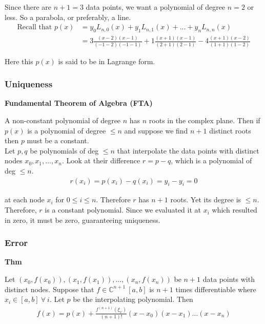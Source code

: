 \documentclass[12pt, letterpaper]{article}
\begin{document}
    Since there are $n+1=3$ data points, we want a polynomial of degree $n=2$ or less. 
    So a parabola, or preferably, a line.
    \begin{align*}
        \text{Recall that } p(x) &= y_0 L_{n,0}(x) + y_1 L_{n,1}(x) + ... + y_n L_{n,n}(x) \\
        &= 3 \frac{(x-2)(x-1)}{(-1-2)(-1-1)} + 1 \frac{(x+1)(x-1)}{(2+1)(2-1)} - 4 \frac{(x+1)(x-2)}{(1+1)(1-2)}
    \end{align*}

    \noindent Here this $p(x)$ is said to be in Lagrange form.

\subsubsection{Uniqueness}
\textbf{Fundamental Theorem of Algebra (FTA)}

A non-constant polynomial of degree $n$ has $n$ roots in the complex plane.
Then if $p(x)$ is a polynomial of degree $\le n$ and suppose we find $n+1$ distinct roots then $p$ must be a constant. \\

Let $p,q$ be polynomials of deg $\le n$ that interpolate the data points with distinct nodes $x_0,x_1,...,x_n$. 
Look at their difference $r= p-q$, which is a polynomial of deg $\le n$.
\begin{align*}
    r(x_i) = p(x_i) - q(x_i) = y_i - y_i = 0
\end{align*}

at each node $x_i$ for $0\le i \le n$. Therefore $r$ has $n+1$ roots.
Yet its degree is $\le n$. Therefore, $r$ is a constant polynomial. 
Since we evaluated it at $x_i$ which resulted in zero, it must be zero, guaranteeing uniqueness.

\subsubsection{Error}

\noindent \textbf{Thm}

Let $(x_0, f(x_0)),(x_1, f(x_1)),...,(x_n,f(x_n))$ be $n+1$ data points with distinct nodes.
Suppose that $f \in \mathbb{C}^{n+1}\ [a,b]$ is $n+1$ times differentiable where $x_i \in [a,b]\ \forall\ i$.
Let $p$ be the interpolating polynomial.
Then 
\begin{align*}
    f(x)=p(x)+ \frac{f^{(n+1)}(\xi_x)}{(n+1)!} (x-x_0)(x-x_1)...(x-x_n)
\end{align*}
\end{document}
